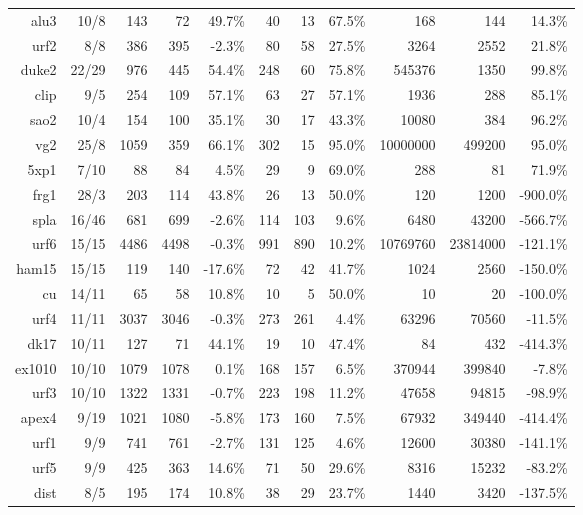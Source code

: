 \documentclass[10pt,letterpaper,twoside,openright]{book}
\begin{document}
\begin{table}[t]
{\begin{tabular}{rr|rrr|rrr|rrr}
alu3 & 10/8 & 143 & 72 & 49.7\% & 40 & 13 & 67.5\% & 168 & 144 & 14.3\% \\ 
urf2 & 8/8 & 386 & 395 & -2.3\% & 80 & 58 & 27.5\% & 3264 & 2552 & 21.8\% \\ 
duke2 & 22/29 & 976 & 445 & 54.4\% & 248 & 60 & 75.8\% & 545376 & 1350 & 99.8\% \\ 
clip & 9/5 & 254 & 109 & 57.1\% & 63 & 27 & 57.1\% & 1936 & 288 & 85.1\% \\ 
sao2 & 10/4 & 154 & 100 & 35.1\% & 30 & 17 & 43.3\% & 10080 & 384 & 96.2\% \\ 
vg2 & 25/8 & 1059 & 359 & 66.1\% & 302 & 15 & 95.0\% & 10000000 & 499200 & 95.0\% \\ 
5xp1 & 7/10 & 88 & 84 & 4.5\% & 29 & 9 & 69.0\% & 288 & 81 & 71.9\% \\ 
frg1 & 28/3 & 203 & 114 & 43.8\% & 26 & 13 & 50.0\% & 120 & 1200 & -900.0\% \\ 
spla & 16/46 & 681 & 699 & -2.6\% & 114 & 103 & 9.6\% & 6480 & 43200 & -566.7\% \\ 
urf6 & 15/15 & 4486 & 4498 & -0.3\% & 991 & 890 & 10.2\% & 10769760 & 23814000 & -121.1\% \\ 
ham15 & 15/15 & 119 & 140 & -17.6\% & 72 & 42 & 41.7\% & 1024 & 2560 & -150.0\% \\ 
cu & 14/11 & 65 & 58 & 10.8\% & 10 & 5 & 50.0\% & 10 & 20 & -100.0\% \\ 
urf4 & 11/11 & 3037 & 3046 & -0.3\% & 273 & 261 & 4.4\% & 63296 & 70560 & -11.5\% \\ 
dk17 & 10/11 & 127 & 71 & 44.1\% & 19 & 10 & 47.4\% & 84 & 432 & -414.3\% \\
ex1010 & 10/10 & 1079 & 1078 & 0.1\% & 168 & 157 & 6.5\% & 370944 & 399840 & -7.8\% \\
urf3 & 10/10 & 1322 & 1331 & -0.7\% & 223 & 198 & 11.2\% & 47658 & 94815 & -98.9\% \\  
apex4 & 9/19 & 1021 & 1080 & -5.8\% & 173 & 160 & 7.5\% & 67932 & 349440 & -414.4\% \\
urf1 & 9/9 & 741 & 761 & -2.7\% & 131 & 125 & 4.6\% & 12600 & 30380 & -141.1\% \\ 
urf5 & 9/9 & 425 & 363 & 14.6\% & 71 & 50 & 29.6\% & 8316 & 15232 & -83.2\% \\ 
dist & 8/5 & 195 & 174 & 10.8\% & 38 & 29 & 23.7\% & 1440 & 3420 & -137.5\% \\
\hline
\end{tabular}}
\label{tab:direct-bdd-results}
\end{table}
\end{document}
